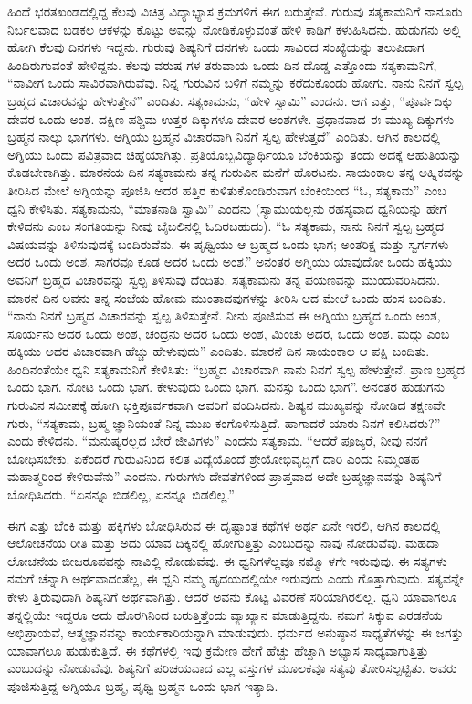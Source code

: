 ಹಿಂದೆ ಭರತಖಂಡದಲ್ಲಿದ್ದ ಕೆಲವು ವಿಚಿತ್ರ ವಿದ್ಯಾಭ್ಯಾಸ ಕ್ರಮಗಳಿಗೆ ಈಗ ಬರುತ್ತೇವೆ. ಗುರುವು ಸತ್ಯಕಾಮನಿಗೆ ನಾನೂರು ನಿರ್ಬಲವಾದ ಬಡಕಲ ಆಕಳನ್ನು ಕೊಟ್ಟು ಅವನ್ನು ನೋಡಿಕೊಳ್ಳುವಂತೆ ಹೇಳಿ ಕಾಡಿಗೆ ಕಳುಹಿಸಿದನು. ಹುಡುಗನು ಅಲ್ಲಿ ಹೋಗಿ ಕೆಲವು ದಿನಗಳು ಇದ್ದನು. ಗುರುವು ಶಿಷ್ಯನಿಗೆ ದನಗಳು ಒಂದು ಸಾವಿರದ ಸಂಖ್ಯೆಯನ್ನು ತಲುಪಿದಾಗ ಹಿಂದಿರುಗುವಂತೆ ಹೇಳಿದ್ದನು. ಕೆಲವು ವರುಷ ಗಳ ತರುವಾಯ ಒಂದು ದಿನ ದೊಡ್ಡ ಎತ್ತೊಂದು ಸತ್ಯಕಾಮನಿಗೆ, “ನಾವೀಗ ಒಂದು ಸಾವಿರವಾಗಿರುವೆವು. ನಿನ್ನ ಗುರುವಿನ ಬಳಿಗೆ ನಮ್ಮನ್ನು ಕರೆದುಕೊಂಡು ಹೋಗು. ನಾನು ನಿನಗೆ ಸ್ವಲ್ಪ ಬ್ರಹ್ಮದ ವಿಚಾರವನ್ನು ಹೇಳುತ್ತೇನೆ” ಎಂದಿತು. ಸತ್ಯಕಾಮನು, “ಹೇಳಿ ಸ್ವಾಮಿ” ಎಂದನು. ಆಗ ಎತ್ತು, “ಪೂರ್ವದಿಕ್ಕು ದೇವರ ಒಂದು ಅಂಶ. ದಕ್ಷಿಣ ಪಶ್ಚಿಮ ಉತ್ತರ ದಿಕ್ಕುಗಳೂ ದೇವರ ಅಂಶಗಳೇ. ಪ್ರಧಾನವಾದ ಈ ಮುಖ್ಯ ದಿಕ್ಕುಗಳು ಬ್ರಹ್ಮನ ನಾಲ್ಕು ಭಾಗಗಳು. ಅಗ್ನಿಯು ಬ್ರಹ್ಮನ ವಿಚಾರವಾಗಿ ನಿನಗೆ ಸ್ವಲ್ಪ ಹೇಳುತ್ತದೆ” ಎಂದಿತು. ಆಗಿನ ಕಾಲದಲ್ಲಿ ಅಗ್ನಿಯು ಒಂದು ಪವಿತ್ರವಾದ ಚಿಹ್ನೆಯಾಗಿತ್ತು. ಪ್ರತಿಯೊಬ್ಬವಿದ್ಯಾರ್ಥಿಯೂ ಬೆಂಕಿಯನ್ನು ತಂದು ಅದಕ್ಕೆ ಆಹುತಿಯನ್ನು ಕೊಡಬೇಕಾಗಿತ್ತು. ಮಾರನೆಯ ದಿನ ಸತ್ಯಕಾಮನು ತನ್ನ ಗುರುವಿನ ಮನೆಗೆ ಹೊರಟನು. ಸಾಯಂಕಾಲ ತನ್ನ ಅಹ್ನಿಕವನ್ನು ತೀರಿಸಿದ ಮೇಲೆ ಅಗ್ನಿಯನ್ನು ಪೂಜಿಸಿ ಅದರ ಹತ್ತಿರ ಕುಳಿತುಕೊಂಡಿರುವಾಗ ಬೆಂಕಿಯಿಂದ “ಓ, ಸತ್ಯಕಾಮ” ಎಂಬ ಧ್ವನಿ ಕೇಳಿಸಿತು. ಸತ್ಯಕಾಮನು, “ಮಾತನಾಡಿ ಸ್ವಾಮಿ” ಎಂದನು (ಸ್ಯಾಮುಯಲ್ಲನು ರಹಸ್ಯವಾದ ಧ್ವನಿಯನ್ನು ಹೇಗೆ ಕೇಳಿದನು ಎಂಬ ಸಂಗತಿಯನ್ನು ನೀವು ಬೈಬಲಿನಲ್ಲಿ ಓದಿರಬಹುದು). “ಓ ಸತ್ಯಕಾಮ, ನಾನು ನಿನಗೆ ಸ್ವಲ್ಪ ಬ್ರಹ್ಮದ ವಿಷಯವನ್ನು ತಿಳಿಸುವುದಕ್ಕೆ ಬಂದಿರುವೆನು. ಈ ಪೃಥ್ವಿಯು ಆ ಬ್ರಹ್ಮದ ಒಂದು ಭಾಗ; ಅಂತರಿಕ್ಷ ಮತ್ತು ಸ್ವರ್ಗಗಳು ಅದರ ಒಂದು ಅಂಶ. ಸಾಗರವೂ ಕೂಡ ಅದರ ಒಂದು ಅಂಶ.” ಅನಂತರ ಅಗ್ನಿಯು ಯಾವುದೋ ಒಂದು ಹಕ್ಕಿಯು ಅವನಿಗೆ ಬ್ರಹ್ಮದ ವಿಚಾರವನ್ನು ಸ್ವಲ್ಪ ತಿಳಿಸುವು ದೆಂದಿತು. ಸತ್ಯಕಾಮನು ತನ್ನ ಪಯಣವನ್ನು ಮುಂದುವರಿಸಿದನು. ಮಾರನೆ ದಿನ ಅವನು ತನ್ನ ಸಂಜೆಯ ಹೋಮ ಮುಂತಾದವುಗಳನ್ನು ತೀರಿಸಿ ಆದ ಮೇಲೆ ಒಂದು ಹಂಸ ಬಂದಿತು. “ನಾನು ನಿನಗೆ ಬ್ರಹ್ಮದ ವಿಚಾರವನ್ನು ಸ್ವಲ್ಪ ತಿಳಿಸುತ್ತೇನೆ. ನೀನು ಪೂಜಿಸುವ ಈ ಅಗ್ನಿಯು ಬ್ರಹ್ಮದ ಒಂದು ಅಂಶ, ಸೂರ್ಯನು ಅದರ ಒಂದು ಅಂಶ, ಚಂದ್ರನು ಅದರ ಒಂದು ಅಂಶ, ಮಿಂಚು ಅದರ, ಒಂದು ಅಂಶ. ಮದ್ಗು ಎಂಬ ಹಕ್ಕಿಯು ಅದರ ವಿಚಾರವಾಗಿ ಹೆಚ್ಚು ಹೇಳುವುದು” ಎಂದಿತು. ಮಾರನೆ ದಿನ ಸಾಯಂಕಾಲ ಆ ಪಕ್ಷಿ ಬಂದಿತು. ಹಿಂದಿನಂತೆಯೇ ಧ್ವನಿ ಸತ್ಯಕಾಮನಿಗೆ ಕೇಳಿಸಿತು: “ಬ್ರಹ್ಮದ ವಿಚಾರವಾಗಿ ನಾನು ನಿನಗೆ ಸ್ವಲ್ಪ ಹೇಳುತ್ತೇನೆ. ಪ್ರಾಣ ಬ್ರಹ್ಮದ ಒಂದು ಭಾಗ. ನೋಟ ಒಂದು ಭಾಗ. ಕೇಳುವುದು ಒಂದು ಭಾಗ. ಮನಸ್ಸು ಒಂದು ಭಾಗ”. ಅನಂತರ ಹುಡುಗನು ಗುರುವಿನ ಸಮೀಪಕ್ಕೆ ಹೋಗಿ ಭಕ್ತಿಪೂರ್ವಕವಾಗಿ ಅವರಿಗೆ ವಂದಿಸಿದನು. ಶಿಷ್ಯನ ಮುಖ್ಯವನ್ನು ನೋಡಿದ ತಕ್ಷಣವೇ ಗುರು, “ಸತ್ಯಕಾಮ, ಬ್ರಹ್ಮ ಜ್ಞಾನಿಯಂತೆ ನಿನ್ನ ಮುಖ ಕಂಗೊಳಿಸುತ್ತಿದೆ. ಹಾಗಾದರೆ ಯಾರು ನಿನಗೆ ಕಲಿಸಿದರು?” ಎಂದು ಕೇಳಿದನು. “ಮನುಷ್ಯರಲ್ಲದ ಬೇರೆ ಜೀವಿಗಳು” ಎಂದನು ಸತ್ಯಕಾಮ. “ಆದರೆ ಪೂಜ್ಯರೆ, ನೀವು ನನಗೆ ಬೋಧಿಸಬೇಕು. ಏಕೆಂದರೆ ಗುರುವಿನಿಂದ ಕಲಿತ ವಿದ್ಯೆಯೊಂದೆ ಶ್ರೇಯೋಭಿವೃದ್ಧಿಗೆ ದಾರಿ ಎಂದು ನಿಮ್ಮಂತಹ ಮಹಾತ್ಮರಿಂದ ಕೇಳಿರುವೆನು” ಎಂದನು. ಗುರುಗಳು ದೇವತೆಗಳಿಂದ ಪ್ರಾಪ್ತವಾದ ಅದೇ ಬ್ರಹ್ಮಜ್ಞಾನವನ್ನು ಶಿಷ್ಯನಿಗೆ ಬೋಧಿಸಿದರು. “ಏನನ್ನೂ ಬಿಡಲಿಲ್ಲ, ಏನನ್ನೂ ಬಿಡಲಿಲ್ಲ.”

ಈಗ ಎತ್ತು ಬೆಂಕಿ ಮತ್ತು ಹಕ್ಕಿಗಳು ಬೋಧಿಸಿರುವ ಈ ದೃಷ್ಟಾಂತ ಕಥೆಗಳ ಅರ್ಥ ಏನೇ ಇರಲಿ, ಆಗಿನ ಕಾಲದಲ್ಲಿ ಆಲೋಚನೆಯ ರೀತಿ ಮತ್ತು ಅದು ಯಾವ ದಿಕ್ಕಿನಲ್ಲಿ ಹೋಗುತ್ತಿತ್ತು ಎಂಬುದನ್ನು ನಾವು ನೋಡುವೆವು. ಮಹದಾ ಲೋಚನೆಯ ಬೀಜರೂಪವನ್ನು ನಾವಿಲ್ಲಿ ನೋಡುವೆವು. ಈ ಧ್ವನಿಗಳೆಲ್ಲವೂ ನಮ್ಮೊ ಳಗೇ ಇರುವುವು. ಈ ಸತ್ಯಗಳು ನಮಗೆ ಚೆನ್ನಾಗಿ ಅರ್ಥವಾದಂತೆಲ್ಲ, ಈ ಧ್ವನಿ ನಮ್ಮ ಹೃದಯದಲ್ಲಿಯೇ ಇರುವುದು ಎಂದು ಗೊತ್ತಾಗುವುದು. ಸತ್ಯವನ್ನೇ ಕೇಳು ತ್ತಿರುವುದಾಗಿ ಶಿಷ್ಯನಿಗೆ ಅರ್ಥವಾಗಿತ್ತು. ಆದರೆ ಅವನು ಕೊಟ್ಟ ವಿವರಣೆ ಸರಿಯಾಗಿರಲಿಲ್ಲ. ಧ್ವನಿ ಯಾವಾಗಲೂ ತನ್ನಲ್ಲಿಯೇ ಇದ್ದರೂ ಅದು ಹೊರಗಿನಿಂದ ಬರುತ್ತಿತ್ತೆಂದು ವ್ಯಾಖ್ಯಾನ ಮಾಡುತ್ತಿದ್ದನು. ನಮಗೆ ಸಿಕ್ಕುವ ಎರಡನೆಯ ಅಭಿಪ್ರಾಯವೆ, ಆತ್ಮಜ್ಞಾನವನ್ನು ಕಾರ್ಯಕಾರಿಯನ್ನಾಗಿ ಮಾಡುವುದು. ಧರ್ಮದ ಅನುಷ್ಠಾನ ಸಾಧ್ಯತೆಗಳನ್ನು ಈ ಜಗತ್ತು ಯಾವಾಗಲೂ ಹುಡುಕುತ್ತಿದೆ. ಈ ಕಥೆಗಳಲ್ಲಿ ಇವು ಕ್ರಮೇಣ ಹೇಗೆ ಹೆಚ್ಚು ಹೆಚ್ಚಾಗಿ ಅಭ್ಯಾಸ ಸಾಧ್ಯವಾಗುತ್ತಿತ್ತು ಎಂಬುದನ್ನು ನೋಡುವೆವು. ಶಿಷ್ಯನಿಗೆ ಪರಿಚಯವಾದ ಎಲ್ಲ ವಸ್ತುಗಳ ಮೂಲಕವೂ ಸತ್ಯವು ತೋರಿಸಲ್ಪಟ್ಟಿತು. ಅವರು ಪೂಜಿಸುತ್ತಿದ್ದ ಅಗ್ನಿಯೂ ಬ್ರಹ್ಮ, ಪೃಥ್ವಿ ಬ್ರಹ್ಮನ ಒಂದು ಭಾಗ ಇತ್ಯಾದಿ.

